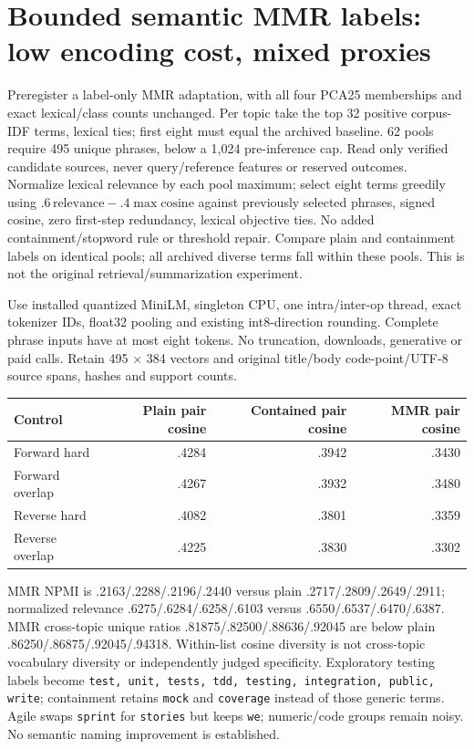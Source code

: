 \documentclass[11pt]{article}
\begin{document}
\section{Bounded semantic MMR labels: low encoding cost, mixed proxies}
Preregister a label-only MMR adaptation\cite{mmrlabels}, with all four PCA25
memberships and exact lexical/class counts unchanged. Per topic take the top
32 positive corpus-IDF terms, lexical ties; first eight must equal the archived
baseline. 62 pools require 495 unique phrases, below a 1,024 pre-inference cap.
Read only verified candidate sources, never query/reference features or reserved
outcomes. Normalize lexical relevance by each pool maximum; select eight terms
greedily using $.6\,\mathrm{relevance}-.4\max\mathrm{cosine}$ against previously
selected phrases, signed cosine, zero first-step redundancy, lexical objective
ties. No added containment/stopword rule or threshold repair. Compare plain
and containment labels on identical pools; all archived diverse terms fall
within these pools. This is not the original retrieval/summarization experiment.

Use installed quantized MiniLM, singleton CPU, one intra/inter-op thread,
exact tokenizer IDs, float32 pooling and existing int8-direction rounding.
Complete phrase inputs have at most eight tokens. No truncation, downloads,
generative or paid calls. Retain 495 $\times$ 384 vectors and original
title/body code-point/UTF-8 source spans, hashes and support counts.

\begin{center}\small
\begin{tabular}{lrrr}
\toprule
Control & Plain pair cosine & Contained pair cosine & MMR pair cosine\\
\midrule
Forward hard & .4284 & .3942 & .3430\\
Forward overlap & .4267 & .3932 & .3480\\
Reverse hard & .4082 & .3801 & .3359\\
Reverse overlap & .4225 & .3830 & .3302\\
\bottomrule
\end{tabular}\end{center}
MMR NPMI is .2163/.2288/.2196/.2440 versus plain
.2717/.2809/.2649/.2911; normalized relevance
.6275/.6284/.6258/.6103 versus .6550/.6537/.6470/.6387. MMR cross-topic
unique ratios .81875/.82500/.88636/.92045 are below plain
.86250/.86875/.92045/.94318. Within-list cosine diversity is not cross-topic
vocabulary diversity or independently judged specificity. Exploratory testing
labels become \texttt{test, unit, tests, tdd, testing, integration, public, write};
containment retains \texttt{mock} and \texttt{coverage} instead of those generic
terms. Agile swaps \texttt{sprint} for \texttt{stories} but keeps \texttt{we};
numeric/code groups remain noisy. No semantic naming improvement is established.
\end{document}
